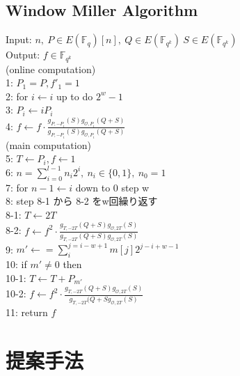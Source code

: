 \documentclass[twocolumn]{jsarticle} %
\begin{document}
\subsection{Window Miller Algorithm}

Input: $n, \ P \in E(\mathbb{F}_q)[n], \ Q \in E(\mathbb{F}_{q^k}) \ S \in E(\mathbb{F}_{q^k})$ \\
Output: $f \in \mathbb{F}_{q^k}$  \\
(online computation) \\
1: \quad $P_1 = P, f'_1=1 $\\
2: \quad for $i \gets i$ up to do $2^w -1$\\
3: \quad $P_i \gets iP_i $\\
4: \quad \quad $f \gets f \cdot \frac{g_{P,-P_i}(S)g_{\mathcal{O},P_i}(Q+S)}{g_{P,-P_i}(S)g_{\mathcal{O},P_i}(Q+S)}$ \\
(main computation) \\
5: \quad $T \gets P_i, f \gets 1 $\\
6: \quad $n=\sum^{l - 1}_{i=0} n_i 2^i, \ n_i \in \{0,1\},\ n_0 = 1$\\
7: \quad for $ n-1 \gets i$ down to 0 step w\\
8: \quad step 8-1 から 8-2 をw回繰り返す\\
8-1: \quad \quad $T \gets 2T $\\
8-2: \quad \quad $f \gets f^2 \cdot \frac{g_{T,-2T}(Q+S)g_{\mathcal{O},2T}(S)}{g_{T,-2T}(Q+S)g_{\mathcal{O},2T}(S)}$\\
9: \quad $m' \gets =\sum^{j=i-w+1}_{i} m[j]2^{j-i+w-1} $\\
10: \quad if $m' \neq 0$ then\\
10-1: \quad \quad $T \gets T + P_{m'} $\\
10-2: \quad \quad $f \gets f^2 \cdot \frac{g_{T,-2T}(Q+S)g_{\mathcal{O},2T}(S)}{g_{T,-2T}(Q+Sg_{\mathcal{O},2T}(S)}$ \\
11: \quad return $f$\\
\section{提案手法}
\end{document}
